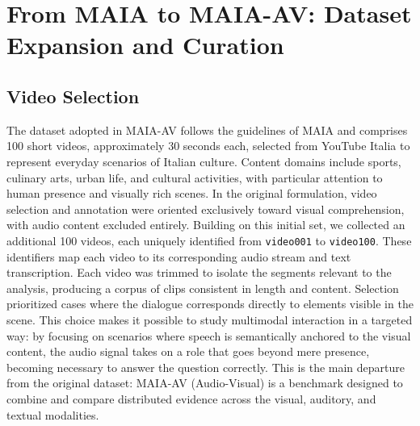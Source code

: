 \section{From MAIA to MAIA-AV: Dataset Expansion and Curation}
\subsection*{Video Selection}
The dataset adopted in MAIA-AV follows the guidelines of \ac{MAIA} and comprises 100 short videos, approximately 30 seconds each, selected from YouTube Italia to represent everyday scenarios of Italian culture. Content domains include sports, culinary arts, urban life, and cultural activities, with particular attention to human presence and visually rich scenes. In the original formulation, video selection and annotation were oriented exclusively toward visual comprehension, with audio content excluded entirely.
Building on this initial set, we collected an additional 100 videos, each uniquely identified from \texttt{video001} to \texttt{video100}. These identifiers map each video to its corresponding audio stream and text transcription. Each video was trimmed to isolate the segments relevant to the analysis, producing a corpus of clips consistent in length and content. Selection prioritized cases where the dialogue corresponds directly to elements visible in the scene.
This choice makes it possible to study multimodal interaction in a targeted way: by focusing on scenarios where speech is semantically anchored to the visual content, the audio signal takes on a role that goes beyond mere presence, becoming necessary to answer the question correctly.
This is the main departure from the original dataset: MAIA-AV (Audio-Visual) is a benchmark designed to combine and compare distributed evidence across the visual, auditory, and textual modalities.
